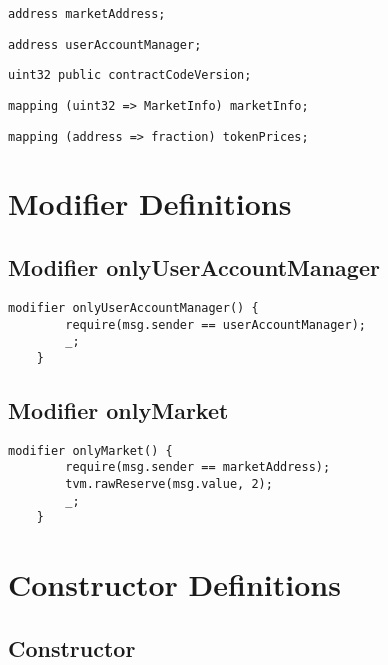 \begin{lstlisting}[firstnumber=9]
    address marketAddress;
\end{lstlisting}

\begin{lstlisting}[firstnumber=10]
    address userAccountManager;
\end{lstlisting}

\begin{lstlisting}[firstnumber=11]
    uint32 public contractCodeVersion;
\end{lstlisting}

\begin{lstlisting}[firstnumber=13]
    mapping (uint32 => MarketInfo) marketInfo;
\end{lstlisting}

\begin{lstlisting}[firstnumber=14]
    mapping (address => fraction) tokenPrices;
\end{lstlisting}

\section{Modifier Definitions}


\subsection{Modifier onlyUserAccountManager}


\begin{lstlisting}[firstnumber=235]
    modifier onlyUserAccountManager() {
        require(msg.sender == userAccountManager);
        _;
    }
\end{lstlisting}

\subsection{Modifier onlyMarket}


\begin{lstlisting}[firstnumber=240]
    modifier onlyMarket() {
        require(msg.sender == marketAddress);
        tvm.rawReserve(msg.value, 2);
        _;
    }
\end{lstlisting}

\section{Constructor Definitions}


\subsection{Constructor}

